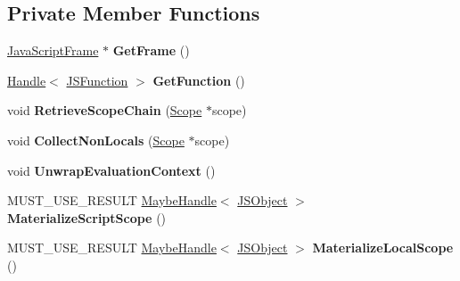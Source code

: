 \subsection*{Private Member Functions}
\begin{DoxyCompactItemize}
\item 
\hyperlink{classv8_1_1internal_1_1_java_script_frame}{Java\+Script\+Frame} $\ast$ {\bfseries Get\+Frame} ()\hypertarget{classv8_1_1internal_1_1_scope_iterator_ab73b61adf6a2c3b120b7841b5d4b1377}{}\label{classv8_1_1internal_1_1_scope_iterator_ab73b61adf6a2c3b120b7841b5d4b1377}

\item 
\hyperlink{classv8_1_1internal_1_1_handle}{Handle}$<$ \hyperlink{classv8_1_1internal_1_1_j_s_function}{J\+S\+Function} $>$ {\bfseries Get\+Function} ()\hypertarget{classv8_1_1internal_1_1_scope_iterator_a4f62f69e28727165a9246c28713b01e4}{}\label{classv8_1_1internal_1_1_scope_iterator_a4f62f69e28727165a9246c28713b01e4}

\item 
void {\bfseries Retrieve\+Scope\+Chain} (\hyperlink{classv8_1_1internal_1_1_scope}{Scope} $\ast$scope)\hypertarget{classv8_1_1internal_1_1_scope_iterator_a0b25528a54b4c0da7f8fe3ece14f68fe}{}\label{classv8_1_1internal_1_1_scope_iterator_a0b25528a54b4c0da7f8fe3ece14f68fe}

\item 
void {\bfseries Collect\+Non\+Locals} (\hyperlink{classv8_1_1internal_1_1_scope}{Scope} $\ast$scope)\hypertarget{classv8_1_1internal_1_1_scope_iterator_aef9e6a5f444b70628a0cbff1252cee56}{}\label{classv8_1_1internal_1_1_scope_iterator_aef9e6a5f444b70628a0cbff1252cee56}

\item 
void {\bfseries Unwrap\+Evaluation\+Context} ()\hypertarget{classv8_1_1internal_1_1_scope_iterator_a9febf51d8b4dd24877986789f7938098}{}\label{classv8_1_1internal_1_1_scope_iterator_a9febf51d8b4dd24877986789f7938098}

\item 
M\+U\+S\+T\+\_\+\+U\+S\+E\+\_\+\+R\+E\+S\+U\+LT \hyperlink{classv8_1_1internal_1_1_maybe_handle}{Maybe\+Handle}$<$ \hyperlink{classv8_1_1internal_1_1_j_s_object}{J\+S\+Object} $>$ {\bfseries Materialize\+Script\+Scope} ()\hypertarget{classv8_1_1internal_1_1_scope_iterator_a7764d38a04ee046ae62f696aab6eebab}{}\label{classv8_1_1internal_1_1_scope_iterator_a7764d38a04ee046ae62f696aab6eebab}

\item 
M\+U\+S\+T\+\_\+\+U\+S\+E\+\_\+\+R\+E\+S\+U\+LT \hyperlink{classv8_1_1internal_1_1_maybe_handle}{Maybe\+Handle}$<$ \hyperlink{classv8_1_1internal_1_1_j_s_object}{J\+S\+Object} $>$ {\bfseries Materialize\+Local\+Scope} ()\hypertarget{classv8_1_1internal_1_1_scope_iterator_a1b98ea949430406208f1f1a1a1581430}{}\label{classv8_1_1internal_1_1_scope_iterator_a1b98ea949430406208f1f1a1a1581430}


\end{DoxyCompactItemize}
